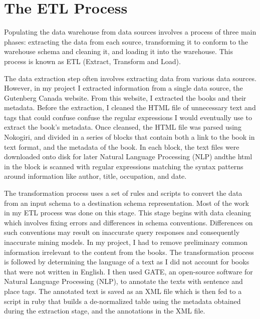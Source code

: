 
\section{The ETL Process} %
\label{sec:the_etl_process}

Populating the data warehouse from data sources involves a process of three main phases: extracting the data from each source, transforming it to conform to
the warehouse schema and cleaning it, and loading it into the warehouse. This process is known as ETL (Extract, Transform and Load).

The data extraction step often involves extracting data from various data sources. However, in my project I extracted information from a single data source,
the Gutenberg Canada website. From this website, I extracted the books and their metadata. Before the extraction, I cleaned the HTML file of unnecessary text
and tags that could confuse confuse the regular expressions I would eventually use to extract the book's metadata. Once cleansed, the HTML file was parsed
using Nokogiri, and divided in a series of blocks that contain both a link to the book in text format, and the metadata of the book. In each block, the text
files were downloaded onto disk for later Natural Language Processing (NLP) andthe html in the block is scanned with regular expressions matching the syntax
patterns around information like author, title, occupation, and date.

The transformation process uses a set of rules and scripts to convert the data from an input schema to a destination schema representation. Most of the work in
my ETL process was done on this stage. This stage begins with data cleaning which involves fixing errors and differences in schema conventions. Differences on
such conventions may result on inaccurate query responses and consequently inaccurate mining models. In my project, I had to remove preliminary common
information irrelevant to the content from the books. The transformation process is followed by determining the language of a text as I did not account for
books that were not written in English. I then used GATE, an open-source software for Natural Language Processing (NLP), to annotate the texts with sentence
and place tags. The annotated text is saved as an XML file which is then fed to a script in ruby that builds a de-normalized table using the metadata obtained
during the extraction stage, and the annotations in the XML file. 

